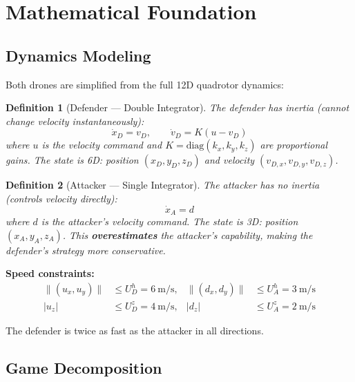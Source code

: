 \documentclass[11pt,a4paper]{article}
\newtheorem{definition}{Definition}
\begin{document}
\section{Mathematical Foundation}

\subsection{Dynamics Modeling}

Both drones are simplified from the full 12D quadrotor dynamics:

\begin{definition}[Defender --- Double Integrator]
The defender has inertia (cannot change velocity instantaneously):
\begin{equation}
\dot{x}_D = v_D, \qquad \dot{v}_D = K(u - v_D)
\label{eq:defender}
\end{equation}
where $u$ is the velocity command and $K = \text{diag}(k_x, k_y, k_z)$ are proportional gains. The state is 6D: position $(x_D, y_D, z_D)$ and velocity $(v_{D,x}, v_{D,y}, v_{D,z})$.
\end{definition}

\begin{definition}[Attacker --- Single Integrator]
The attacker has no inertia (controls velocity directly):
\begin{equation}
\dot{x}_A = d
\label{eq:attacker}
\end{equation}
where $d$ is the attacker's velocity command. The state is 3D: position $(x_A, y_A, z_A)$. This \textbf{overestimates} the attacker's capability, making the defender's strategy more conservative.
\end{definition}

\textbf{Speed constraints:}
\begin{align}
\|(u_x, u_y)\| &\leq U_D^h = 6~\text{m/s}, & \|(d_x, d_y)\| &\leq U_A^h = 3~\text{m/s} \\
|u_z| &\leq U_D^z = 4~\text{m/s}, & |d_z| &\leq U_A^z = 2~\text{m/s}
\end{align}

The defender is twice as fast as the attacker in all directions.

\subsection{Game Decomposition}
\end{document}
